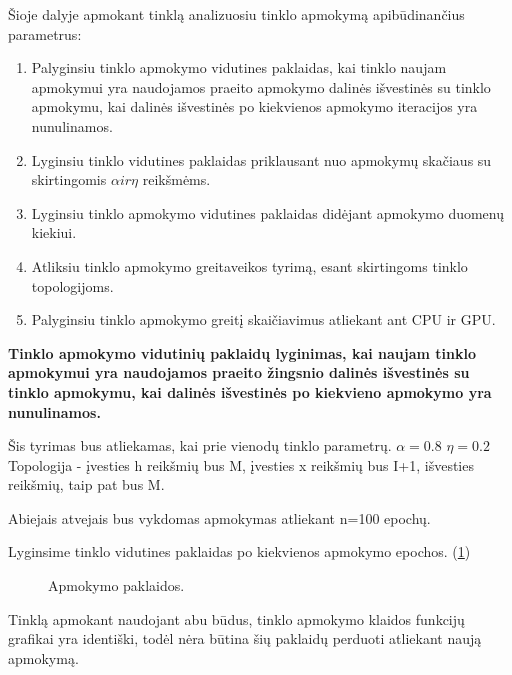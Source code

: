 Šioje dalyje apmokant tinklą analizuosiu tinklo apmokymą apibūdinančius parametrus:
\begin{enumerate}
  \item Palyginsiu tinklo apmokymo vidutines paklaidas, kai tinklo naujam apmokymui yra naudojamos praeito apmokymo dalinės išvestinės su tinklo apmokymu, kai dalinės išvestinės po kiekvienos apmokymo iteracijos yra nunulinamos.
  \item Lyginsiu tinklo vidutines paklaidas priklausant nuo apmokymų skačiaus su skirtingomis $\alpha ir \eta$ reikšmėms.
  \item Lyginsiu tinklo apmokymo vidutines paklaidas didėjant apmokymo duomenų kiekiui.
  \item Atliksiu tinklo apmokymo greitaveikos tyrimą, esant skirtingoms tinklo topologijoms.
  \item Palyginsiu tinklo apmokymo greitį skaičiavimus atliekant ant CPU ir GPU.
\end{enumerate}

\textbf{Tinklo apmokymo vidutinių paklaidų lyginimas, kai naujam tinklo apmokymui yra naudojamos praeito žingsnio dalinės išvestinės su tinklo apmokymu, kai dalinės išvestinės po kiekvieno apmokymo yra nunulinamos.}

Šis tyrimas bus atliekamas, kai prie vienodų tinklo parametrų.
$\alpha = 0.8$
$\eta = 0.2$
Topologija - įvesties h reikšmių bus M, įvesties x reikšmių bus I+1, išvesties reikšmių, taip pat bus M.

Abiejais atvejais bus vykdomas apmokymas atliekant n=100 epochų.

Lyginsime tinklo vidutines paklaidas po kiekvienos apmokymo epochos. (\ref{fig:paklaidos1})

\begin{figure}[h!]
  \centering
{}
\caption{Apmokymo paklaidos.}
\label{fig:paklaidos1}
\end{figure}

Tinklą apmokant naudojant abu būdus, tinklo apmokymo klaidos funkcijų grafikai yra identiški, todėl nėra būtina šių paklaidų perduoti atliekant naują apmokymą.

